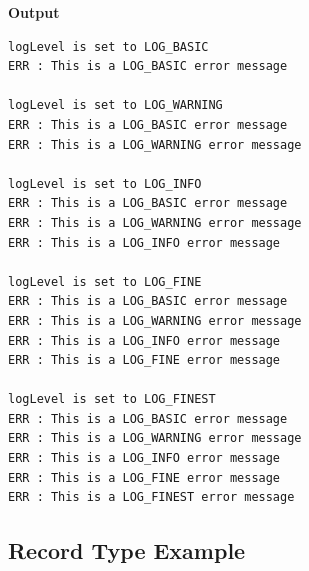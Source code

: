 \documentclass[a4paper, titlepage, 11pt]{article}
\begin{document}
\textbf{Output}

\begin{verbatim}
logLevel is set to LOG_BASIC
ERR : This is a LOG_BASIC error message

logLevel is set to LOG_WARNING
ERR : This is a LOG_BASIC error message
ERR : This is a LOG_WARNING error message

logLevel is set to LOG_INFO
ERR : This is a LOG_BASIC error message
ERR : This is a LOG_WARNING error message
ERR : This is a LOG_INFO error message

logLevel is set to LOG_FINE
ERR : This is a LOG_BASIC error message
ERR : This is a LOG_WARNING error message
ERR : This is a LOG_INFO error message
ERR : This is a LOG_FINE error message

logLevel is set to LOG_FINEST
ERR : This is a LOG_BASIC error message
ERR : This is a LOG_WARNING error message
ERR : This is a LOG_INFO error message
ERR : This is a LOG_FINE error message
ERR : This is a LOG_FINEST error message
\end{verbatim}

\newpage

\subsection{Record Type Example}
\end{document}
